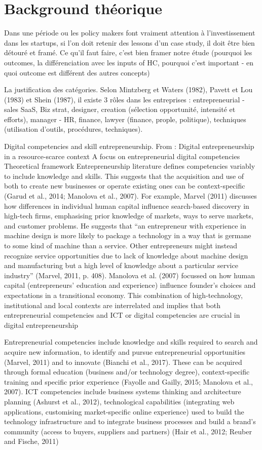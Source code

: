 \documentclass[11pt]{article}
\begin{document}
\section{Background théorique}

Dans une période ou les policy makers font vraiment attention à l'investissement dans les startups, si l'on doit retenir des lessons d'un case study, il doit être bien détouré et framé. Ce qu'il faut faire, c'est bien framer notre étude (pourquoi les outcomes, la différenciation avec les inputs of HC, pourquoi c'est important - en quoi outcome est différent des autres concepts)

La justification des catégories.
Selon Mintzberg et Waters (1982), Pavett et Lou (1983) et Shein (1987), il existe 3 rôles dans les entreprises : entrepreneurial - sales SaaS, Biz strat, designer, creation (sélection opportunité, intensité et efforts), manager - HR, finance, lawyer (finance, prople, politique), techniques (utilisation d'outils, procédures, techniques).

Digital competencies and skill entrepreneurship.
From : Digital entrepreneurship in a resource-scarce context A focus on entrepreneurial digital competencies
Theoretical framework Entrepreneurship literature defines competencies variably to include knowledge and skills. This suggests that the acquisition and use of both to create new businesses or operate existing ones can be context-specific (Garud et al., 2014; Manolova et al., 2007). For example, Marvel (2011) discusses how differences in individual human capital influence search-based discovery in high-tech firms, emphasising prior knowledge of markets, ways to serve markets, and customer problems. He suggests that “an entrepreneur with experience in machine design is more likely to package a technology in a way that is germane to some kind of machine than a service. Other entrepreneurs might instead recognize service opportunities due to lack of knowledge about machine design and manufacturing but a high level of knowledge about a particular service industry” (Marvel, 2011, p. 408). Manolova et al. (2007) focussed on how human capital (entrepreneurs’ education and experience) influence founder’s choices and expectations in a transitional economy. This combination of high-technology, institutional and local contexts are interrelated and implies that both entrepreneurial competencies and ICT or digital competencies are crucial in digital entrepreneurship

Entrepreneurial competencies include knowledge and skills required to search and acquire new information, to identify and pursue entrepreneurial opportunities (Marvel, 2011) and to innovate (Bianchi et al., 2017). These can be acquired through formal education (business and/or technology degree), context-specific training and specific prior experience (Fayolle and Gailly, 2015; Manolova et al., 2007). ICT competencies include business systems thinking and architecture planning (Ashurst et al., 2012), technological capabilities (integrating web applications, customising market-specific online experience) used to build the technology infrastructure and to integrate business processes and build a brand’s community (access to buyers, suppliers and partners) (Hair et al., 2012; Reuber and Fische, 2011)
\end{document}
